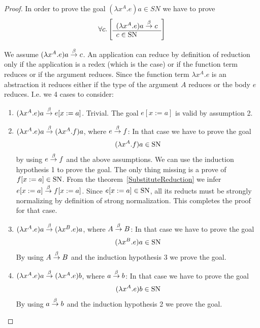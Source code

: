\begin{theorem}
\begin{proof}
        In order to prove the goal $(\lambda x^A.e)a \in SN$ we have to prove
        $$
        \forall c. \left[ \begin{array}{l} (\lambda x^A.e)a \stackrel{\beta}{\to} c \\ \hline c \in \text{SN}\end{array} \right]
        $$

        We assume $(\lambda x^A.e)a \stackrel{\beta}{\to} c$. An application can reduce by
        definition of reduction only if the application is a redex (which is the
        case) or if the function term reduces or if the argument reduces. Since
        the function term $\lambda x^A.e$ is an abstraction it reduces either if
        the type of the argument $A$ reduces or the body $e$ reduces. I.e. we 4
        cases to consider:
        \begin{enumerate}
        \item $(\lambda x^A.e)a \stackrel{\beta}{\to} e[x:=a]$. Trivial. The goal $e[x:=a]$ is
            valid by assumption 2.

        \item $(\lambda x^A.e)a \stackrel{\beta}{\to} (\lambda x^A.f)a$, where $e \stackrel{\beta}{\to} f$:
            In that case we have to prove the goal
            $$
                (\lambda x^A.f)a \in \text{SN}
            $$
            by using $e \stackrel{\beta}{\to} f$ and the above assumptions. We can use the
                induction hypothesis 1 to prove the goal. The
                only thing missing is a prove of $f[x:=a] \in \text{SN}$. From the
                theorem~\ref{SubstituteReduction} we infer $e[x:=a] \stackrel{\beta}{\to}
                f[x:=a]$. Since $e[x:=a] \in \text{SN}$, all its
                reducts must be strongly normalizing by definition of strong
                normalization. This completes the proof for that case.

        \item $(\lambda x^A.e)a \stackrel{\beta}{\to} (\lambda x^B.e)a$, where $A \stackrel{\beta}{\to} B$:
            In that case we have to prove the goal
            $$
                (\lambda x^B.e)a \in \text{SN}
            $$
            By using $A \stackrel{\beta}{\to} B$ and the induction hypothesis 3 we prove the
            goal.

        \item $(\lambda x^A.e)a \stackrel{\beta}{\to} (\lambda x^A.e)b$, where $a \stackrel{\beta}{\to}
            b$: In that case we have to prove the goal
            $$
                (\lambda x^A.e)b \in \text{SN}
            $$
            By using $a \stackrel{\beta}{\to} b$ and the induction hypothesis 2 we prove the
            goal.
        \end{enumerate}
    \end{proof}
\end{theorem}



